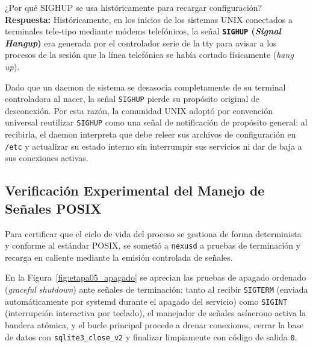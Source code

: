 \documentclass[10pt,a4paper]{article}
\begin{document}
\begin{pregunta}{¿Por qué SIGHUP se usa históricamente para recargar configuración?}
    \textbf{Respuesta:} Históricamente, en los inicios de los sistemas UNIX conectados a terminales tele-tipo mediante módems telefónicos, la señal \textbf{\texttt{SIGHUP} (\textit{Signal Hangup})} era generada por el controlador serie de la tty para avisar a los procesos de la sesión que la línea telefónica se había cortado físicamente (\textit{hang up}).
    
    Dado que un daemon de sistema se desasocia completamente de su terminal controladora al nacer, la señal \texttt{SIGHUP} pierde su propósito original de desconexión. Por esta razón, la comunidad UNIX adoptó por convención universal reutilizar \texttt{SIGHUP} como una señal de notificación de propósito general: al recibirla, el daemon interpreta que debe releer sus archivos de configuración en \texttt{/etc} y actualizar su estado interno sin interrumpir sus servicios ni dar de baja a sus conexiones activas.
\end{pregunta}

\subsection{Verificación Experimental del Manejo de Señales POSIX}

Para certificar que el ciclo de vida del proceso se gestiona de forma determinista y conforme al estándar POSIX, se sometió a \texttt{nexusd} a pruebas de terminación y recarga en caliente mediante la emisión controlada de señales.

En la Figura~\ref{fig:etapa05_apagado} se aprecian las pruebas de apagado ordenado (\textit{graceful shutdown}) ante señales de terminación: tanto al recibir \texttt{SIGTERM} (enviada automáticamente por systemd durante el apagado del servicio) como \texttt{SIGINT} (interrupción interactiva por teclado), el manejador de señales asíncrono activa la bandera atómica, y el bucle principal procede a drenar conexiones, cerrar la base de datos con \texttt{sqlite3\_close\_v2} y finalizar limpiamente con código de salida \texttt{0}.
\end{document}
